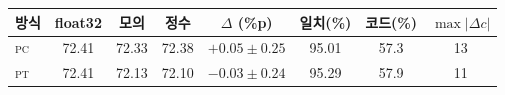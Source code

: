 \setlength{\tabcolsep}{5pt}
\begin{tabular}{lccccccc}
\toprule
방식 & float32 & 모의 & 정수 & $\Delta$ (\%p) & 일치(\%) & 코드(\%) & $\max|\Delta c|$ \\
\midrule
\textsc{pc} & 72.41 & 72.33 & 72.38 & $+0.05 \pm 0.25$ & 95.01 & 57.3 & 13 \\
\textsc{pt} & 72.41 & 72.13 & 72.10 & $-0.03 \pm 0.24$ & 95.29 & 57.9 & 11 \\
\bottomrule
\end{tabular}
